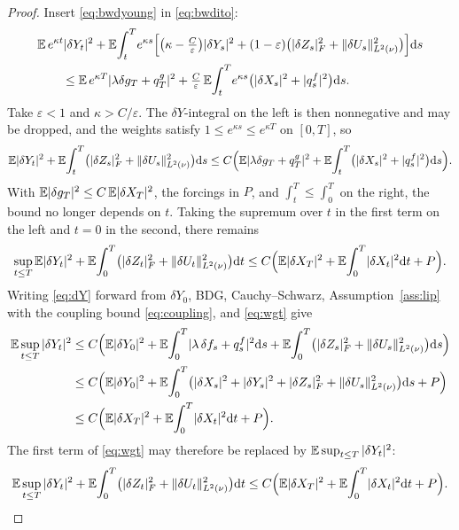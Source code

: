\begin{proof}
Insert \eqref{eq:bwdyoung} in \eqref{eq:bwdito}:
\[
\begin{aligned}
&\mathbb{E}\,e^{\kappa t}|\delta Y_t|^2
+\mathbb{E}\!\int_t^T\!e^{\kappa s}\Big[\big(\kappa-\tfrac{C}{\varepsilon}\big)|\delta Y_s|^2
+(1-\varepsilon)\big(|\delta Z_s|_F^2+\lVert \delta U_s\rVert_{L^2(\nu)}^2\big)\Big]\mathrm{d} s\\
&\qquad\le\mathbb{E}\,e^{\kappa T}|\lambda\delta g_T+q^g_T|^2
+\tfrac{C}{\varepsilon}\,\mathbb{E}\!\int_t^T\!e^{\kappa s}\big(|\delta X_s|^2+|q^f_s|^2\big)\mathrm{d} s .
\end{aligned}
\]
Take $\varepsilon<1$ and $\kappa>C/\varepsilon$. The $\delta Y$-integral on the left is then
nonnegative and may be dropped, and the weights satisfy $1\le e^{\kappa s}\le e^{\kappa T}$
on $[0,T]$, so
\[
\mathbb{E}|\delta Y_t|^2+\mathbb{E}\!\int_t^T\!\big(|\delta Z_s|_F^2+\lVert \delta U_s\rVert_{L^2(\nu)}^2\big)\mathrm{d} s
\le C\Big(\mathbb{E}|\lambda\delta g_T+q^g_T|^2
+\mathbb{E}\!\int_t^T\!\big(|\delta X_s|^2+|q^f_s|^2\big)\mathrm{d} s\Big).
\]
With $\mathbb{E}|\delta g_T|^2\le C\,\mathbb{E}|\delta X_T|^2$, the forcings in $P$, and
$\int_t^T\le\int_0^T$ on the right, the bound no longer depends on $t$. Taking the
supremum over $t$ in the first term on the left and $t=0$ in the second, there remains
\begin{equation}\label{eq:wgt}
\sup_{t\le T}\mathbb{E}|\delta Y_t|^2
+\mathbb{E}\!\int_0^T\!\big(|\delta Z_t|_F^2+\lVert \delta U_t\rVert_{L^2(\nu)}^2\big)\mathrm{d} t
\le C\Big(\mathbb{E}|\delta X_T|^2+\mathbb{E}\!\int_0^T\!|\delta X_t|^2\mathrm{d} t+P\Big).
\end{equation}
Writing \eqref{eq:dY} forward from $\delta Y_0$, BDG, Cauchy--Schwarz,
Assumption~\ref{ass:lip} with the coupling bound \eqref{eq:coupling}, and \eqref{eq:wgt} give
\[
\begin{aligned}
\E\sup_{t\le T}|\delta Y_t|^2
&\le C\Big(\E|\delta Y_0|^2+\E\!\int_0^T\!|\lambda\,\delta f_s+q^f_s|^2\diff s
+\E\!\int_0^T\!\big(|\delta Z_s|_F^2+\Lnorm{\delta U_s}^2\big)\diff s\Big)\\
&\le C\Big(\E|\delta Y_0|^2
+\E\!\int_0^T\!\big(|\delta X_s|^2+|\delta Y_s|^2+|\delta Z_s|_F^2+\Lnorm{\delta U_s}^2\big)\diff s+P\Big)\\
&\le C\Big(\E|\delta X_T|^2+\E\!\int_0^T\!|\delta X_t|^2\diff t+P\Big) .
\end{aligned}
\]
The first term of \eqref{eq:wgt} may therefore be replaced by
$\mathbb{E}\sup_{t\le T}|\delta Y_t|^2$:
\begin{equation}\label{eq:bwd}
\mathbb{E}\sup_{t\le T}|\delta Y_t|^2+\mathbb{E}\!\int_0^T\!\big(|\delta Z_t|_F^2+\lVert \delta U_t\rVert_{L^2(\nu)}^2\big)\mathrm{d} t
\le C\Big(\mathbb{E}|\delta X_T|^2+\mathbb{E}\!\int_0^T\!|\delta X_t|^2\mathrm{d} t+P\Big).
\end{equation}


\end{proof}
